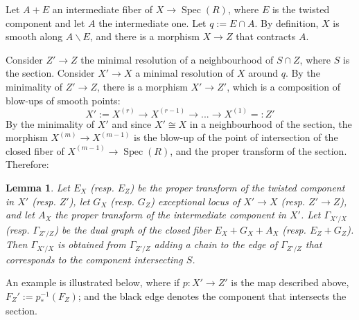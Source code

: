 \documentclass[11pt]{amsart}
\newcommand{\spec}{\operatorname{Spec}}
\newtheorem{Lemma}[theorem]{Lemma}
\theoremstyle{definition}
\begin{document}
Let $A+E$ an intermediate fiber of $X \to \spec(R)$, where $E$ is the twisted component and let $A$ the intermediate one. Let $q:=E \cap A$.
By definition, $X$ is smooth along $A \smallsetminus E$, and there is a morphism $X \to Z$ that contracts $A$.

Consider $Z' \to Z$ the minimal resolution of a neighbourhood of $S \cap Z$, where $S$ is the section. Consider
$X' \to X$ a minimal resolution of $X$ around
$q$. By the minimality of $Z' \to Z$, there is a morphism $X' \to Z'$, which is a composition of
blow-ups of smooth points:
$$X':=X^{(r)} \to X^{(r-1)} \to ... \to X^{(1)}=:Z'$$
By the minimality of $X'$ and since $X' \cong X$ in a neighbourhood of the section, the morphism
$X^{(m)} \to X^{(m-1)}$ is the blow-up of the point of intersection of the closed fiber of $X^{(m-1)} \to \spec(R)$,
and the proper transform of the section. Therefore:
\begin{Lemma}\label{Lemma:dual:graph:intermediate}
Let $E_X$ (resp. $E_Z$) be the proper transform of the twisted component in $X'$ (resp. $Z'$), let $G_X$ (resp. $G_Z$)
exceptional locus of $X' \to X$ (resp. $Z' \to Z$), and let $A_X$ the proper transform of the
intermediate component in $X'$. Let $\Gamma_{X'/X}$ (resp. $\Gamma_{Z'/Z}$) be the dual graph of the closed fiber $E_X + G_X+A_X$
(resp. $E_Z+ G_Z$).
Then $\Gamma_{X'/X}$ is obtained
 from $\Gamma_{Z'/Z}$ adding a chain to the edge of $\Gamma_{Z'/Z}$ that corresponds to the component intersecting $S$.
\end{Lemma}
An example is illustrated below, where if $p:X' \to Z'$ is the map described above,
$F_Z':=p_*^{-1}(F_Z)$; and the black edge denotes the component that intersects the section.
\end{document}
